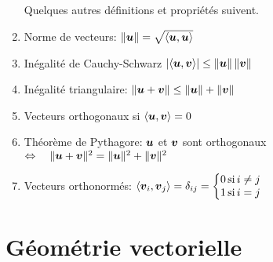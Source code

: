 \begin{adjmulticols}{1}{0in}{-2in}
\begin{enumerate}
Quelques autres définitions et propriétés suivent.

\item Norme de vecteurs: $\lVert\boldsymbol{u}\rVert = \sqrt{\langle\boldsymbol{u}, \boldsymbol{u} \rangle}$
\item Inégalité de Cauchy-Schwarz $ \lvert\langle\boldsymbol{u}, \boldsymbol{v}\rangle\rvert \leq \lVert\boldsymbol{u}\rVert \, \lVert\boldsymbol{v}\rVert$
\item Inégalité triangulaire:
	$\lVert\boldsymbol{u} + \boldsymbol{v}\rVert \leq \lVert\boldsymbol{u}\rVert + \lVert\boldsymbol{v}\rVert$
\item Vecteurs orthogonaux si $\langle \boldsymbol{u}, \boldsymbol{v}\rangle = 0$
\item Théorème de Pythagore: $\boldsymbol{u}$ et $\boldsymbol{v}$ sont orthogonaux  
$\Leftrightarrow\quad \lVert\boldsymbol{u}+\boldsymbol{v}\rVert^2 = \lVert\boldsymbol{u}\rVert^2 + \lVert\boldsymbol{v}\rVert^2$
\item Vecteurs orthonormés: $\displaystyle \langle \boldsymbol{v}_i, \boldsymbol{v}_j \rangle = \delta_{ij} = \left\{
\begin{matrix}
0 \, \mbox{si} \, i \neq j \\
1 \, \mbox{si} \, i = j
\end{matrix}\right.$
\end{enumerate}


\section{Géométrie vectorielle}


\end{adjmulticols}
